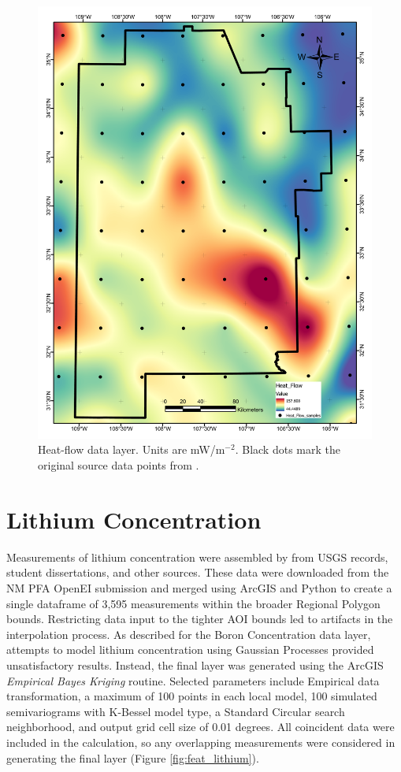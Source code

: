 \begin{figure}[H]
\centering
\includegraphics[width=0.75\linewidth]{templates/images/Figure-HeatFlow.pdf}
\caption[Heat flow data layer]{Heat-flow data layer. Units are mW/m$^{-2}$. Black dots mark the original source data points from \protect\citet{lucazeau_analysis_2019}.}
\label{fig:feat_heatflow}
\end{figure}

\section{Lithium Concentration}\label{app:dl_lithium}

Measurements of lithium concentration were assembled by \citet{bielicki_hydrogeolgic_2015} from USGS records, student dissertations, and other sources. These data were downloaded from the NM PFA OpenEI submission \citep{kelley_geothermal_2015} and merged using ArcGIS and Python to create a single dataframe of 3,595 measurements within the broader Regional Polygon bounds. Restricting data input to the tighter AOI bounds led to artifacts in the interpolation process. As described for the Boron Concentration data layer, attempts to model lithium concentration using Gaussian Processes provided unsatisfactory results. Instead, the final layer was generated using the ArcGIS \textit{Empirical Bayes Kriging} routine. Selected parameters include Empirical data transformation, a maximum of 100 points in each local model, 100 simulated semivariograms with K-Bessel model type, a Standard Circular search neighborhood, and output grid cell size of 0.01 degrees. All coincident data were included in the calculation, so any overlapping measurements were considered in generating the final layer (Figure \ref{fig:feat_lithium}).

